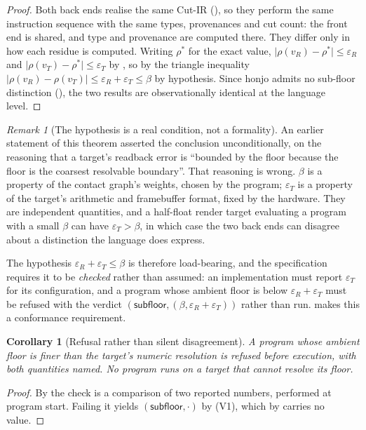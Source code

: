 \documentclass[11pt,twocolumn,a4paper]{article}
\theoremstyle{thmstyle}
\newtheorem{corollary}[theorem]{Corollary}
\theoremstyle{definition}
\theoremstyle{remark}
\newtheorem{remark}[theorem]{Remark}
\newcommand{\flo}{\beta}
\newcommand{\res}{\rho}
\newcommand{\abs}[1]{\lvert#1\rvert}
\newcommand{\eps}{\varepsilon}
\begin{document}
\begin{proof}
Both back ends realise the same Cut-IR (), so they perform
the same instruction sequence with the same types, provenances and cut
count: the front end is shared, and type and provenance are computed
there. They differ only in how each residue is computed. Writing
$\res^\ast$ for the exact value, $\abs{\res(v_R)-\res^\ast}\le\eps_R$ and
$\abs{\res(v_T)-\res^\ast}\le\eps_T$ by , so by the
triangle inequality $\abs{\res(v_R)-\res(v_T)}\le\eps_R+\eps_T\le\flo$ by
hypothesis. Since honjo admits no sub-floor distinction
(), the two results are observationally identical
at the language level.
\end{proof}

\begin{remark}[The hypothesis is a real condition, not a formality]
\label{rem:equiv-honest}
An earlier statement of this theorem asserted the conclusion
unconditionally, on the reasoning that a target's readback error is
``bounded by the floor because the floor is the coarsest resolvable
boundary''. That reasoning is wrong. $\flo$ is a property of the contact
graph's weights, chosen by the program; $\eps_T$ is a property of the
target's arithmetic and framebuffer format, fixed by the hardware. They
are independent quantities, and a half-float render target evaluating a
program with a small $\flo$ can have $\eps_T>\flo$, in which case the two
back ends can disagree about a distinction the language does express.

The hypothesis $\eps_R+\eps_T\le\flo$ is therefore load-bearing, and the
specification requires it to be \emph{checked} rather than assumed: an
implementation must report $\eps_T$ for its configuration, and a program
whose ambient floor is below $\eps_R+\eps_T$ must be refused with the
verdict $(\textsf{subfloor},(\flo,\eps_R+\eps_T))$ rather than run.
 makes this a conformance requirement.
\end{remark}

\begin{corollary}[Refusal rather than silent disagreement]
\label{cor:refuse-lowfloor}
A program whose ambient floor is finer than the target's numeric
resolution is refused before execution, with both quantities named. No
program runs on a target that cannot resolve its floor.
\end{corollary}

\begin{proof}
By  the check is a comparison of two reported
numbers, performed at program start. Failing it yields
$(\textsf{subfloor},\cdot)$ by (V1), which by
 carries no value.
\end{proof}
\end{document}
